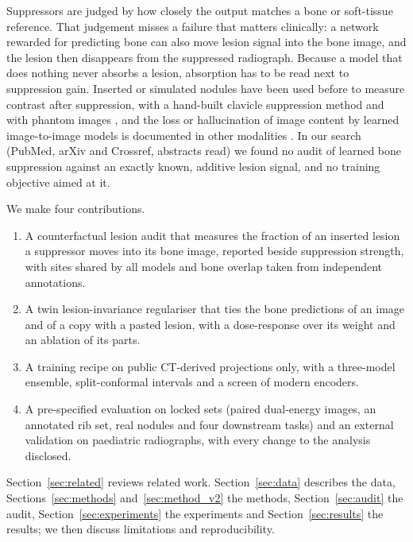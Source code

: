 Suppressors are judged by how closely the output matches a bone or soft-tissue reference. That judgement misses a failure that matters
clinically: a network rewarded for predicting bone can also move lesion signal into the bone image, and the lesion then disappears from the
suppressed radiograph. Because a model that does nothing never absorbs a lesion, absorption has to be read next to suppression gain.
Inserted or simulated nodules have been used before to measure contrast after suppression, with a hand-built clavicle suppression method and
with phantom images \citep{hogeweg2013suppression,takagi2020dose}, and the loss or hallucination of image content by learned image-to-image
models is documented in other modalities \citep{cohen2018distribution,antun2020instabilities,bhadra2021hallucinations,tivnan2024hallucination}.
In our search (PubMed, arXiv and Crossref, abstracts read) we found no audit of learned bone suppression against an exactly known, additive
lesion signal, and no training objective aimed at it.

We make four contributions.
\begin{enumerate}
\item A counterfactual lesion audit that measures the fraction of an inserted lesion a suppressor moves into its bone image, reported beside
 suppression strength, with sites shared by all models and bone overlap taken from independent annotations.
\item A twin lesion-invariance regulariser that ties the bone predictions of an image and of a copy with a pasted lesion, with a dose-response over
 its weight and an ablation of its parts.
\item A training recipe on public CT-derived projections only, with a three-model ensemble, split-conformal intervals and a screen of modern encoders.
\item A pre-specified evaluation on locked sets (paired dual-energy images, an annotated rib set, real nodules and four downstream tasks) and an
 external validation on paediatric radiographs, with every change to the analysis disclosed.
\end{enumerate}

Section~\ref{sec:related} reviews related work. Section~\ref{sec:data} describes the data, Sections~\ref{sec:methods} and~\ref{sec:method_v2} the
methods, Section~\ref{sec:audit} the audit, Section~\ref{sec:experiments} the experiments and Section~\ref{sec:results} the results; we then discuss
limitations and reproducibility.
